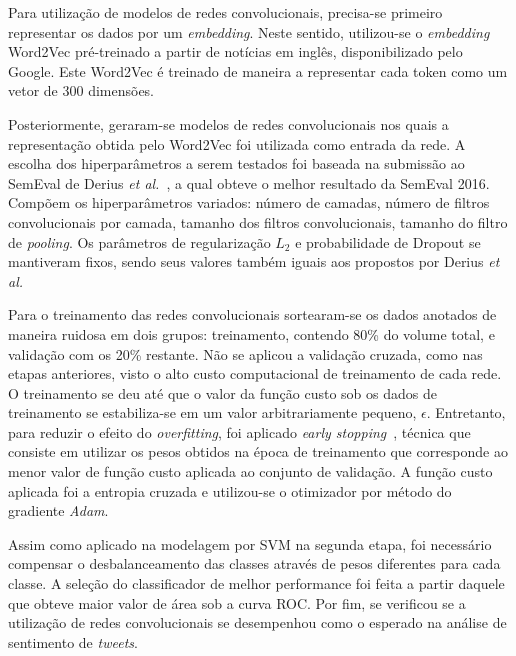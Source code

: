 Para utilização de modelos de redes convolucionais, precisa-se primeiro representar os dados por um \textit{embedding}.
Neste sentido, utilizou-se o \textit{embedding} Word2Vec pré-treinado a partir de notícias em inglês, disponibilizado
pelo Google.
Este Word2Vec é treinado de maneira a representar cada token como um vetor de 300 dimensões.

Posteriormente, geraram-se modelos de redes convolucionais nos quais a representação obtida pelo Word2Vec foi utilizada
como entrada da rede.
A escolha dos hiperparâmetros a serem testados foi baseada na submissão ao SemEval de Derius
\textit{et al.}~\cite{deriu16}, a qual obteve o melhor resultado da SemEval 2016.
Compõem os hiperparâmetros variados: número de camadas, número de filtros convolucionais por camada, tamanho dos filtros
convolucionais, tamanho do filtro de \textit{pooling}.
Os parâmetros de regularização $L_{2}$ e probabilidade de Dropout se mantiveram fixos, sendo seus valores também iguais aos
propostos por Derius \textit{et al.}

Para o treinamento das redes convolucionais sortearam-se os dados anotados de maneira ruidosa em dois grupos:
treinamento, contendo 80\% do volume total, e validação com os 20\% restante.
Não se aplicou a validação cruzada, como nas etapas anteriores, visto o alto custo computacional de treinamento de cada
rede.
O treinamento se deu até que o valor da função custo sob os dados de treinamento se estabiliza-se em um valor
arbitrariamente pequeno, $\epsilon$.
Entretanto, para reduzir o efeito do \textit{overfitting}, foi aplicado \textit{early stopping}~\cite{caruana01},
técnica que consiste em utilizar os pesos obtidos na época de treinamento que corresponde ao menor valor de função custo
aplicada ao conjunto de validação.
A função custo aplicada foi a entropia cruzada e utilizou-se o otimizador por método do gradiente \textit{Adam}.

Assim como aplicado na modelagem por SVM na segunda etapa, foi necessário compensar o desbalanceamento das classes
através de pesos diferentes para cada classe.
A seleção do classificador de melhor performance foi feita a partir daquele que obteve maior valor de área sob a curva
ROC.
Por fim, se verificou se a utilização de redes convolucionais se desempenhou como o esperado na análise de sentimento
de \textit{tweets}.
